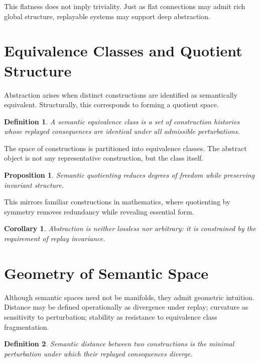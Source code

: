 \documentclass[11pt]{article}
\newtheorem{definition}{Definition}[section]
\newtheorem{proposition}{Proposition}[section]
\newtheorem{corollary}{Corollary}[section]
\begin{document}
This flatness does not imply triviality. Just as flat connections may admit rich global structure, replayable systems may support deep abstraction.

\section{Equivalence Classes and Quotient Structure}

Abstraction arises when distinct constructions are identified as semantically equivalent. Structurally, this corresponds to forming a quotient space.

\begin{definition}
A semantic equivalence class is a set of construction histories whose replayed consequences are identical under all admissible perturbations.
\end{definition}

The space of constructions is partitioned into equivalence classes. The abstract object is not any representative construction, but the class itself.

\begin{proposition}
Semantic quotienting reduces degrees of freedom while preserving invariant structure.
\end{proposition}

This mirrors familiar constructions in mathematics, where quotienting by symmetry removes redundancy while revealing essential form.

\begin{corollary}
Abstraction is neither lossless nor arbitrary: it is constrained by the requirement of replay invariance.
\end{corollary}

\section{Geometry of Semantic Space}

Although semantic spaces need not be manifolds, they admit geometric intuition. Distance may be defined operationally as divergence under replay; curvature as sensitivity to perturbation; stability as resistance to equivalence class fragmentation.

\begin{definition}
Semantic distance between two constructions is the minimal perturbation under which their replayed consequences diverge.
\end{definition}
\end{document}
